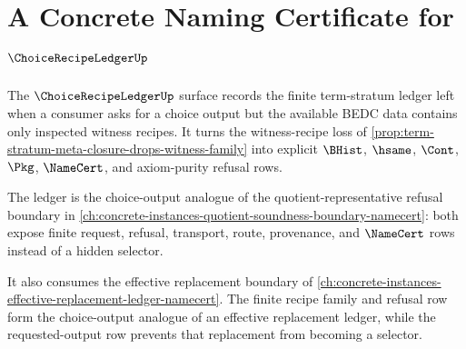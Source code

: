 \chapter{A Concrete Naming Certificate for $\ChoiceRecipeLedgerUp$}
\label{ch:concrete-instances-choice-recipe-ledger-namecert}

The $\ChoiceRecipeLedgerUp$ surface records the finite term-stratum ledger left when a consumer asks for a choice output but the available BEDC data contains only inspected witness recipes. It turns the witness-recipe loss of \autoref{prop:term-stratum-meta-closure-drops-witness-family} into explicit $\BHist$, $\hsame$, $\Cont$, $\Pkg$, $\NameCert$, and axiom-purity refusal rows.

The ledger is the choice-output analogue of the quotient-representative refusal boundary in \autoref{ch:concrete-instances-quotient-soundness-boundary-namecert}: both expose finite request, refusal, transport, route, provenance, and $\NameCert$ rows instead of a hidden selector.

It also consumes the effective replacement boundary of \autoref{ch:concrete-instances-effective-replacement-ledger-namecert}. The finite recipe family and refusal row form the choice-output analogue of an effective replacement ledger, while the requested-output row prevents that replacement from becoming a selector.

